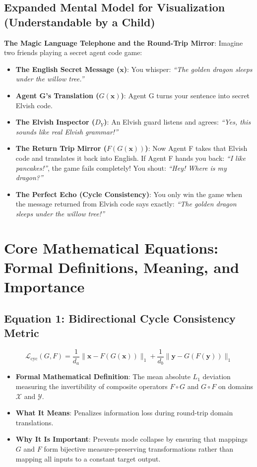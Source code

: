 \documentclass[11pt,a4paper]{article}
\theoremstyle{definition}
\begin{document}
\subsection{Expanded Mental Model for Visualization (Understandable by a Child)}
\textbf{The Magic Language Telephone and the Round-Trip Mirror}:
Imagine two friends playing a secret agent code game:
\begin{itemize}
    \item \textbf{The English Secret Message ($\mathbf{x}$)}:
    You whisper: \emph{``The golden dragon sleeps under the willow tree.''}
    
    \item \textbf{Agent G's Translation ($G(\mathbf{x})$)}:
    Agent G turns your sentence into secret Elvish code.
    
    \item \textbf{The Elvish Inspector ($D_Y$)}:
    An Elvish guard listens and agrees: \emph{``Yes, this sounds like real Elvish grammar!''}
    
    \item \textbf{The Return Trip Mirror ($F(G(\mathbf{x}))$)}:
    Now Agent F takes that Elvish code and translates it back into English. If Agent F hands you back: \emph{``I like pancakes!''}, the game fails completely! You shout: \emph{``Hey! Where is my dragon?''}
    
    \item \textbf{The Perfect Echo (Cycle Consistency)}:
    You only win the game when the message returned from Elvish code says exactly: \emph{``The golden dragon sleeps under the willow tree!''}
\end{itemize}

\section{Core Mathematical Equations: Formal Definitions, Meaning, and Importance}

\subsection{\textbf{Equation 1: Bidirectional Cycle Consistency Metric}}
{\boldmath
\begin{equation}
\mathcal{L}_{\text{cyc}}(G, F) = \frac{1}{d_a} \|\mathbf{x} - F(G(\mathbf{x}))\|_1 + \frac{1}{d_b} \|\mathbf{y} - G(F(\mathbf{y}))\|_1
\end{equation}
}
\begin{itemize}
    \item \textbf{Formal Mathematical Definition}:
    The mean absolute $L_1$ deviation measuring the invertibility of composite operators $F \circ G$ and $G \circ F$ on domains $\mathcal{X}$ and $\mathcal{Y}$.
    \item \textbf{What It Means}:
    Penalizes information loss during round-trip domain translations.
    \item \textbf{Why It Is Important}:
    Prevents mode collapse by ensuring that mappings $G$ and $F$ form bijective measure-preserving transformations rather than mapping all inputs to a constant target output.
\end{itemize}
\end{document}
